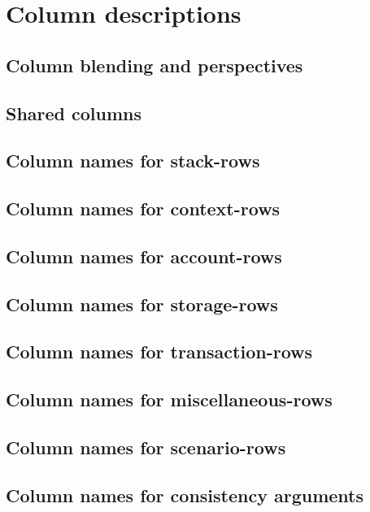 

\section{Column descriptions \lispDone{}}                          \label{hub: columns}
\subsection{Column blending and perspectives}                      \label{hub: perspectives}                 
\subsection{Shared columns \lispDone{}}                            \label{hub: shared columns}               
\subsection{Column names for stack-rows \lispDone{}}               \label{hub: stack columns}                
\subsection{Column names for context-rows \lispDone{}}             \label{hub: context columns}              
\subsection{Column names for account-rows \lispDone{}}             \label{hub: account columns}              
\subsection{Column names for storage-rows \lispDone{}}             \label{hub: storage columns}              
\subsection{Column names for transaction-rows \lispDone{}}         \label{hub: transaction columns}          
\subsection{Column names for miscellaneous-rows \lispDone{}}       \label{hub: miscellaneous columns}        
\subsection{Column names for scenario-rows \lispDone{}}            \label{hub: scenario columns}             
\subsection{Column names for consistency arguments \lispTodo{}}    \label{hub: consistency argument columns} 

